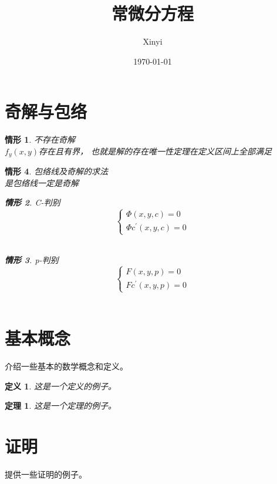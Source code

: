 \documentclass[12pt, a4paper]{article}
\newtheorem{theorem}{定理}[section]
\newtheorem{definition}{定义}[section]
\newtheorem{case}{情形}[section]
\begin{document}
\title{常微分方程}
\author{Xinyi}
\date{\today}
\maketitle

\section{奇解与包络}
\begin{case}不存在奇解  \\
    $ f_y(x, y)$存在且有界，
    也就是解的存在唯一性定理在定义区间上全部满足
\end{case}

\begin{case} 包络线及奇解的求法\\
    是包络线一定是奇解\\
    \begin{case} 
        C-判别
        $$
        \left\{
            \begin{array}{l}
        \Phi(x, y, c)=0 \\
        \Phi c^{\prime}(x, y, c)=0
        \end{array}
        \right.
        $$\\    
    \end{case}
    \begin{case} 
        p-判别  
        $$
        \left\{
            \begin{array}{l}
        F(x, y, p)=0 \\
        F c^{\prime}(x, y, p)=0
        \end{array}
        \right.
        $$\\
    \end{case}
\end{case}

\section{基本概念}
介绍一些基本的数学概念和定义。

\begin{definition}
    这是一个定义的例子。
\end{definition}

\begin{theorem}
    这是一个定理的例子。
\end{theorem}

\section{证明}
提供一些证明的例子。
\end{document}
